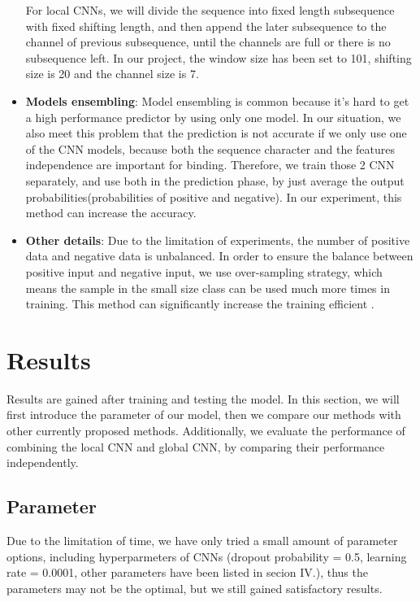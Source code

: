 \documentclass[twoside,twocolumn]{article}
\begin{document}
\begin{itemize}
    For local CNNs, we will divide the sequence into fixed length subsequence with fixed shifting length, and then append the later subsequence to the channel of previous subsequence, until the channels are full or there is no subsequence left. In our project, the window size has been set to 101, shifting size is 20 and the channel size is 7.

    \item \textbf{Models ensembling}: Model ensembling is common because it's hard to get a high performance predictor by using only one model. In our situation, we also meet this problem that the prediction is not accurate if we only use one of the CNN models, because both the sequence character and the features independence are important for binding. Therefore, we train those 2 CNN separately, and use both in the prediction phase, by just average the output probabilities(probabilities of positive and negative). In our experiment, this method can increase the accuracy.

    \item \textbf{Other details}: Due to the limitation of experiments, the number of positive data and negative data is unbalanced. In order to ensure the balance between positive input and negative input, we use over-sampling strategy, which means the sample in the small size class can be used much more times in training. This method can significantly increase the training efficient \cite{ref4}.
\end{itemize}
\section{Results}
Results are gained after training and testing the model. In this section, we will
first introduce the parameter of our model, then we compare our methods with other
currently proposed methods. Additionally, we evaluate the performance of combining
the local CNN and global CNN, by comparing their performance independently.

\subsection{Parameter}
Due to the limitation of time, we have only tried a small amount of parameter options,
including hyperparmeters of CNNs (dropout probability = 0.5, learning rate = 0.0001, other
parameters have been listed in secion IV.), thus the parameters may not be the optimal, 
but we still gained satisfactory results.
\end{document}
